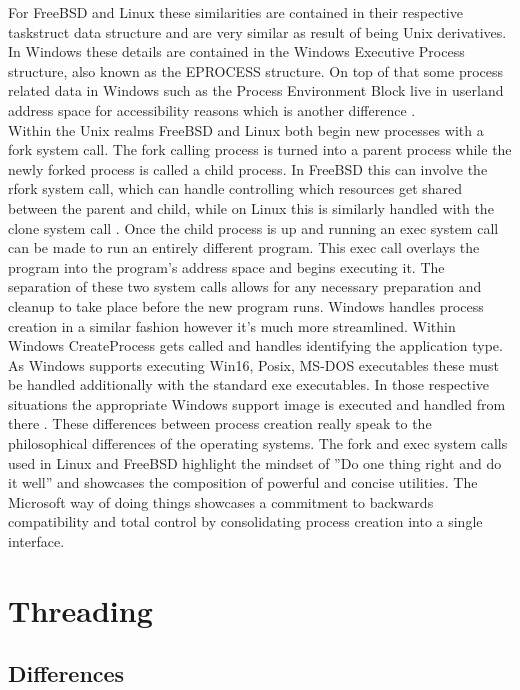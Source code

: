\documentclass[letterpaper,10pt,draftclsnofoot,onecolumn]{IEEEtran}
\begin{document}
For FreeBSD and Linux these similarities are contained in their respective task\textunderscore struct data structure and are very similar as result of being Unix derivatives. In Windows these details are contained in the Windows Executive Process structure, also known as the EPROCESS structure. On top of that some process related data in Windows such as the Process Environment Block live in userland address space for accessibility reasons which is another difference \cite{russinovich}.\\

Within the Unix realms FreeBSD and Linux both begin new processes with a fork system call. The fork calling process is turned into a parent process while the newly forked process is called a child process. In FreeBSD this can involve the rfork system call, which can handle controlling which resources get shared between the parent and child, while on Linux this is similarly handled with the clone system call \cite{love}. Once the child process is up and running an exec system call can be made to run an entirely different program. This exec call overlays the program into the program’s address space and begins executing it. The separation of these two system calls allows for any necessary preparation and cleanup to take place before the new program runs. Windows handles process creation in a similar fashion however it’s much more streamlined. Within Windows CreateProcess gets called and handles identifying the application type. As Windows supports executing Win16, Posix, MS-DOS executables these must be handled additionally with the standard exe executables. In those respective situations the appropriate Windows support image is executed and handled from there \cite{russinovich}. These differences between process creation really speak to the philosophical differences of the operating systems. The fork and exec system calls used in Linux and FreeBSD highlight the mindset of ''Do one thing right and do it well'' and showcases the composition of powerful and concise utilities. The Microsoft way of doing things showcases a commitment to backwards compatibility and total control by consolidating process creation into a single interface.\\

\newpage
\section{Threading}

\subsection{Differences}
\end{document}
